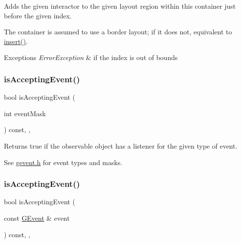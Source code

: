 Adds the given interactor to the given layout region within this container just before the given index. 

The container is assumed to use a border layout; if it does not, equivalent to \mbox{\hyperlink{classsgl_1_1GContainer_afffb8f789ff9a8466fbae5b846a0ebe7}{insert()}}. 
\begin{DoxyExceptions}{Exceptions}
{\em Error\+Exception} & if the index is out of bounds \\
\hline
\end{DoxyExceptions}
\mbox{\label{classsgl_1_1GObservable_aeec1adc19aa0f33de62390686ee1382c}} 
\subsubsection{\texorpdfstring{is\+Accepting\+Event()}{isAcceptingEvent()}\hspace{0.1cm}{\footnotesize\ttfamily [1/3]}}
{\footnotesize\ttfamily bool is\+Accepting\+Event (\begin{DoxyParamCaption}\item[{int}]{event\+Mask }\end{DoxyParamCaption}) const\hspace{0.3cm}{\ttfamily [protected]}, {\ttfamily [virtual]}, {\ttfamily [inherited]}}



Returns true if the observable object has a listener for the given type of event. 

See \mbox{\hyperlink{gevent_8h_source}{gevent.\+h}} for event types and masks. \mbox{\label{classsgl_1_1GObservable_aa31c73145a29dcb92848a92e0cfaea41}} 
\subsubsection{\texorpdfstring{is\+Accepting\+Event()}{isAcceptingEvent()}\hspace{0.1cm}{\footnotesize\ttfamily [2/3]}}
{\footnotesize\ttfamily bool is\+Accepting\+Event (\begin{DoxyParamCaption}\item[{const \mbox{\hyperlink{classsgl_1_1GEvent}{G\+Event}} \&}]{event }\end{DoxyParamCaption}) const\hspace{0.3cm}{\ttfamily [protected]}, {\ttfamily [virtual]}, {\ttfamily [inherited]}}



